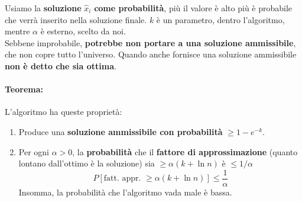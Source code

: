 Usiamo la \textbf{soluzione} $\hat x_i$ \textbf{come probabilità}, più il valore è alto più è probabile che verrà inserito nella soluzione finale. $k$ è un parametro, dentro l'algoritmo, mentre $\alpha$ è esterno, scelto da noi.\\

Sebbene improbabile, \textbf{potrebbe non portare a una soluzione ammissibile}, che non copre tutto l'universo. Quando anche fornisce una soluzione ammissibile \textbf{non è detto che sia ottima}.\\

\newpage

\paragraph{Teorema:} L'algoritmo ha queste proprietà:
\begin{enumerate}
	\item Produce una \textbf{soluzione ammissibile con probabilità} $\geq 1 - e^{-k}$.\\
	
	\item Per ogni $\alpha > 0$, la \textbf{probabilità} che il \textbf{fattore di approssimazione} (quanto lontano dall'ottimo è la soluzione) sia $\geq \alpha (k + \ln n)$ è $\leq 1/\alpha$
	$$ P[\text{fatt. appr. } \geq \alpha (k + \ln n)] \leq \frac{1}{\alpha} $$
	Insomma, la probabilità che l'algoritmo vada male è bassa.\\
\end{enumerate}

